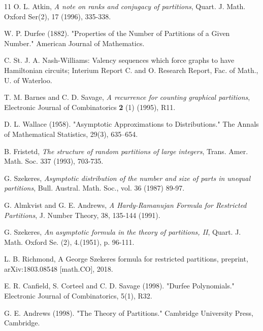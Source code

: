 \documentclass[pdflatex,sn-mathphys-num]{sn-jnl}%
\theoremstyle{thmstyleone}%
\theoremstyle{thmstyletwo}%
\theoremstyle{thmstylethree}%
\theoremstyle{thmstylethree}%
\theoremstyle{thmstylethree}%
\begin{document}
\begin{thebibliography}{11}
    O. L. Atkin, \textit{A note on ranks and conjugacy of partitions}, Quart. J. Math. Oxford Ser(2), 17 (1996), 335-338.

    W. P. Durfee (1882). "Properties of the Number of Partitions of a Given Number." American Journal of Mathematics.

    C. St. J. A. Nash-Williams: Valency sequences which force graphs to have Hamiltonian circuits; Interium Report C. and O. Research Report, Fac. of Math., U. of Waterloo.

    T. M. Barnes and C. D. Savage, \emph{A recurrence for counting graphical partitions}, Electronic Journal of Combinatorics \textbf{2} (1) (1995), R11.

    D. L. Wallace (1958). "Asymptotic Approximations to Distributions." The Annals of Mathematical Statistics, 29(3), 635–654.

    B. Fristetd,
    \textit{The structure of random partitions of large integers}, Trans. Amer. Math. Soc. 337 (1993), 703-735.

    G. Szekeres,
    \textit{Asymptotic distribution of the number and size of parts in unequal partitions}, Bull. Austral. Math. Soc., vol. 36 (1987) 89-97.

    G. Almkvist and G. E. Andrews, \textit{A Hardy-Ramanujan Formula for Restricted Partitions}, J. Number Theory, 38, 135-144 (1991).

    G. Szekeres,
    \textit{An asymptotic formula in the theory of partitions, II}, Quart. J. Math. Oxford Se. (2), 4.(1951), p. 96-111.

    L. B. Richmond, A George Szekeres formula for restricted partitions, preprint, arXiv:1803.08548 [math.CO], 2018.

    E. R. Canfield, S. Corteel and C. D. Savage (1998). "Durfee Polynomials." Electronic Journal of Combinatorics, 5(1), R32.

    G. E. Andrews (1998). "The Theory of Partitions." Cambridge University Press, Cambridge.

    

\end{thebibliography}
\end{document}
